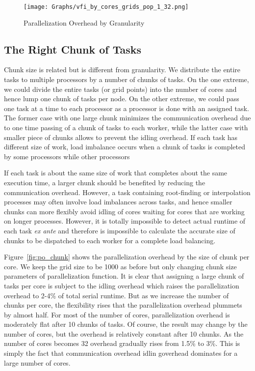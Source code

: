 \documentclass[12pt]{article}
\begin{document}
\begin{figure}[h!]
\begin{center}
\caption{\sf Parallelization Overhead by Granularity}
\texttt{[image: Graphs/vfi\_by\_cores\_grids\_pop\_1\_32.png]}\label{fig:po_grid}
\end{center}
\end{figure}


\subsection{The Right Chunk of Tasks}
Chunk size is related but is different from granularity. We distribute the entire tasks to multiple processors by a number of chunks of tasks. On the one extreme, we could divide the entire tasks (or grid points) into the number of cores and hence lump one chunk of tasks per node. On the other extreme, we could pass one task at a time to each processor as a processor is done with an assigned task. The former case with one large chunk minimizes the communication overhead due to one time passing of a chunk of tasks to each worker, while the latter case with smaller piece of chunks allows to prevent the idling overhead. If each task has different size of work, load imbalance occurs when a chunk of tasks is completed by some processors while other processors

If each task is about the same size of work that completes about the same execution time, a larger chunk should be benefited by reducing the communication overhead. However, a task containing root-finding or interpolation processes may often involve load imbalances across tasks, and hence smaller chunks can more flexibly avoid idling of cores waiting for cores that are working on longer processes. However, it is totally impossible to detect actual runtime of each task \textit{ex ante} and therefore is impossible to calculate the accurate size of chunks to be dispatched to each worker for a complete load balancing.

Figure~\ref{fig:po_chunk} shows the parallelization overhead by the size of chunk per core. We keep the grid size to be 1000 as before but only changing chunk size parameters of parallelization function. It is clear that assigning a large chunk of tasks per core is subject to the idling overhead which raises the parallelization overhead to 2-4\% of total serial runtime. But as we increase the number of chunks per core, the flexibility rises that the parallelization overhead plummets by almost half. For most of the number of cores, parallelization overhead is moderately flat after 10 chunks of tasks. Of course, the result may change by the number of cores, but the overhead is relatively constant after 10 chunks. As the number of cores becomes 32 overhead gradually rises from 1.5\% to 3\%. This is simply the fact that  communication overhead idlin goverhead dominates for a large number of cores.
\end{document}
